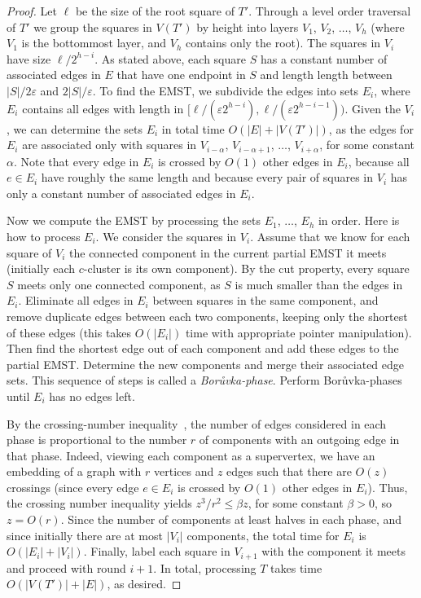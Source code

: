 \documentclass[11pt]{paper}
\newcommand {\eps} {\varepsilon}
\newcommand {\boruvka}{Bor\r{u}vka}
\begin{document}
\begin{proof}
  Let $\ell$ be the size of the root square of $T'$.
  Through a level order traversal of $T'$ we group the
  squares in $V(T')$ by height into layers $V_1$, $V_2$, $\ldots$, $V_h$
  (where $V_1$ is the bottommost layer, and $V_h$ contains
  only the root). The squares in $V_i$ have size $\ell/2^{h-i}$.
  As stated above, each square $S$ has a constant number of
  associated edges in $E$ that have one endpoint in $S$ and length
  length  between $|S|/2\eps$ and $2|S|/\eps$.
  To find the EMST, we subdivide the edges into
  sets $E_i$, where $E_i$ contains all edges with length
  in $[\ell/(\eps2^{h-i}), \ell/(\eps2^{h-i-1}))$. Given the
  $V_i$, we can determine the sets $E_i$ in total time
  $O(|E| + |V(T')|)$, as the edges for $E_i$ are
  associated only with squares in $V_{i-\alpha}$, $V_{i-\alpha+1}$,
  $\ldots$, $V_{i+\alpha}$,
  for some constant $\alpha$. 
  Note that every edge
  in $E_i$ is crossed by $O(1)$ other edges in $E_i$, because all
  $e \in E_i$ have roughly the same length and because every pair of squares in
  $V_i$ has only a constant number of associated edges in $E_i$.

  Now we compute the EMST by processing the sets $E_1$,
  $\ldots$, $E_h$ in order. Here is how to
  process $E_i$. We consider the squares in $V_i$.
  Assume that we know for each square of $V_i$ the connected
  component in the current partial EMST it meets (initially
  each $c$-cluster is its own component). By the cut property, every
  square $S$ meets
  only one connected component, as $S$ is much smaller than the
  edges in $E_i$.
  Eliminate all edges in $E_i$ between squares in the same component,
  and 
  remove duplicate edges between
  each two components, keeping only the shortest of these edges
  (this takes $O(|E_i|)$ time with appropriate pointer manipulation).
  Then find the shortest edge out of each component
  and add these edges to the partial EMST. Determine the new components
  and merge their associated edge sets.
  This sequence of steps is called
  a \emph{\boruvka-phase}.
  Perform \boruvka-phases until $E_i$ has no edges left.

  By the crossing-number inequality~\cite[Theorem~4.3.1]{Matousek02}, the 
  number of edges considered in
  each phase is proportional to the number $r$ of components with an outgoing
  edge in that phase. Indeed, viewing each component as a supervertex,
  we have an embedding of a graph with $r$ vertices and $z$ edges such
  that there are $O(z)$ crossings (since every edge $e \in E_i$ is crossed
  by $O(1)$ other edges in $E_i$). Thus, the crossing number
  inequality yields $z^3/r^2 \leq \beta z$, 
  for some
  constant $\beta > 0$, so $z = O(r)$.  Since the number of
  components at least halves in each phase, and since initially there
  are at most $|V_i|$ components, the total time
  for $E_i$ is $O(|E_i| + |V_i|)$. Finally, label each
  square in $V_{i+1}$ with the component  it meets and proceed
  with round $i+1$.
  In total, processing $T$ takes time $O(|V(T')| + |E|)$, as desired.
\end{proof}
\end{document}
